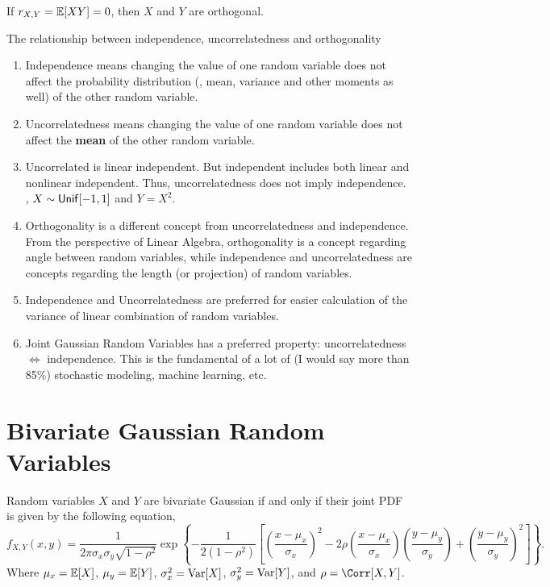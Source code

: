 \begin{definition}
    [Orthogonality]
    If $r_{X,Y}=\E{XY}=0$, then $X$ and $Y$ are orthogonal.
\end{definition}

\begin{theorem}
    The relationship between independence, uncorrelatedness and orthogonality
    \begin{enumerate}
        \item Independence means changing the value of one random variable does not affect the probability distribution (\ie, mean, variance and other moments as well) of the other random variable.
        \item Uncorrelatedness means changing the value of one random variable does not affect the \textbf{mean} of the other random variable.
        \item Uncorrelated is linear independent. But independent includes both linear and nonlinear independent. Thus, uncorrelatedness does not imply independence. \eg, $X\sim \mathsf{Unif}[-1,1]$ and $Y=X^2$.
        \item Orthogonality is a different concept from uncorrelatedness and independence. From the perspective of Linear Algebra, orthogonality is a concept regarding angle between random variables, while independence and uncorrelatedness are concepts regarding the length (or projection) of random variables.
        \item Independence and Uncorrelatedness are preferred for easier calculation of the variance of linear combination of random variables.
        \item Joint Gaussian Random Variables has a preferred property: uncorrelatedness $\iff$ independence. This is the fundamental of a lot of (I would say more than 85\%) stochastic modeling, machine learning, etc.
    \end{enumerate}
\end{theorem}


\section{Bivariate Gaussian Random Variables}
\begin{definition}
    Random variables $X$ and $Y$ are bivariate Gaussian if and only if their joint PDF is given by the following equation,
    \[f_{X,Y}(x,y)=\frac{1}{2\pi\sigma_x\sigma_y\sqrt{1-\rho^2}}\exp\left\{-\frac{1}{2(1-\rho^2)}\left[\left(\frac{x-\mu_x}{\sigma_x}\right)^2-2\rho\left(\frac{x-\mu_x}{\sigma_x}\right)\left(\frac{y-\mu_y}{\sigma_y}\right)+\left(\frac{y-\mu_y}{\sigma_y}\right)^2\right]\right\}.\]
    Where $\mu_x=\E{X}$, $\mu_y=\E{Y}$, $\sigma_x^2=\mathop{\mathrm{Var}}\nolimits[X]$, $\sigma_y^2=\mathop{\mathrm{Var}}\nolimits[Y]$, and $\rho=\Corr[X,Y]$.
\end{definition}

